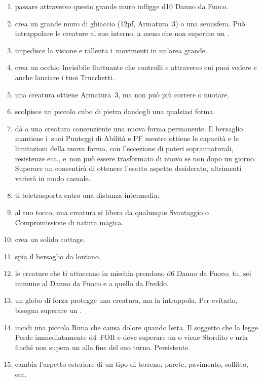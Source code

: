 \documentclass[itdr]{subfiles}
\begin{document}
\begin{enumerate}
	\item {} passare attraverso questo grande muro infligge d10 Danno da Fuoco.
	\item {} crea un grande muro di ghiaccio (12pf, Armatura~3) o una semisfera. Può intrappolare le creature al suo interno, a meno che non superino un .
	\item {} impedisce la visione e rallenta i~movimenti in un'area grande.
	\item {} crea un occhio Invisibile fluttuante che controlli e attraverso cui puoi vedere e anche lanciare i tuoi Trucchetti.
	\item {} una creatura ottiene Armatura~3, ma non può più correre o nuotare.
	\item {} scolpisce un piccolo cubo di pietra dandogli una qualsiasi forma.
	\item {} dà a una creatura consenziente una nuova forma permanente. Il bersaglio mantiene i~suoi Punteggi di Abilità e PF mentre ottiene le capacità e le limitazioni della nuova forma, con l'eccezione di poteri soprannaturali, resistenze ecc., e~non può essere trasformato di nuovo se non dopo un giorno. Superare un  consentirà di ottenere l'esatto aspetto desiderato, altrimenti varierà in modo casuale.
	\item {} ti teletrasporta entro una distanza intermedia.
	\item {} al tuo tocco, una creatura si libera da qualunque Svantaggio o Compromissione di natura magica.
	\item {} crea un solido cottage.
	\item {} spia il bersaglio da lontano.
	\item {} le creature che ti attaccano in mischia prendono d6 Danno da Fuoco; tu, sei immune al Danno da Fuoco e a quello da Freddo.
	\item {} un globo di forza protegge una creatura, ma la intrappola. Per evitarlo, bisogna superare un .
	\item {} incidi una piccola Runa che causa dolore quando letta. Il soggetto che la legge Perde immediatamente d4~FOR e deve superare un  o viene Stordito e urla finché non supera un  alla fine del suo turno. Persistente.
	\item {} cambia l'aspetto esteriore di un tipo di terreno, parete, pavimento, soffitto, ecc.

\end{enumerate}
\end{document}
